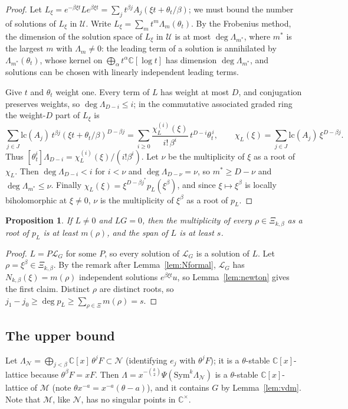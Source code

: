 \documentclass[11pt]{amsart}
\newtheorem{proposition}[thm]{Proposition}
\theoremstyle{definition}
\newcommand{\C}{\mathbb C}
\newcommand{\Sym}{\mathrm{Sym}}
\newcommand{\lc}{\mathrm{lc}}
\begin{document}
\begin{proof}
Let $L_\xi=e^{-\beta\xi t}Le^{\beta\xi t}=\sum_jt^{\beta j}A_j(\xi t+\theta_t/\beta)$; we must bound the number of solutions of $L_\xi$ in $\mathcal U$. Write $L_\xi=\sum_mt^m\Lambda_m(\theta_t)$. By the Frobenius method, the dimension of the solution space of $L_\xi$ in $\mathcal U$ is at most $\deg\Lambda_{m^*}$, where $m^*$ is the largest $m$ with $\Lambda_m\ne0$: the leading term of a solution is annihilated by $\Lambda_{m^*}(\theta_t)$, whose kernel on $\bigoplus_\alpha t^\alpha\C[\log t]$ has dimension $\deg\Lambda_{m^*}$, and solutions can be chosen with linearly independent leading terms.

Give $t$ and $\theta_t$ weight one. Every term of $L$ has weight at most $D$, and conjugation preserves weights, so $\deg\Lambda_{D-i}\le i$; in the commutative associated graded ring the weight-$D$ part of $L_\xi$ is
\[
\sum_{j\in J}\lc(A_j)\,t^{\beta j}(\xi t+\theta_t/\beta)^{D-\beta j}=\sum_{i\ge0}\frac{\chi_L^{(i)}(\xi)}{i!\,\beta^i}\,t^{D-i}\theta_t^{\,i},\qquad\chi_L(\xi)=\sum_{j\in J}\lc(A_j)\,\xi^{D-\beta j}.
\]
Thus $[\theta_t^i]\Lambda_{D-i}=\chi_L^{(i)}(\xi)/(i!\beta^i)$. Let $\nu$ be the multiplicity of $\xi$ as a root of $\chi_L$. Then $\deg\Lambda_{D-i}<i$ for $i<\nu$ and $\deg\Lambda_{D-\nu}=\nu$, so $m^*\ge D-\nu$ and $\deg\Lambda_{m^*}\le\nu$. Finally $\chi_L(\xi)=\xi^{D-\beta j^*}p_L(\xi^\beta)$, and since $\xi\mapsto\xi^\beta$ is locally biholomorphic at $\xi\ne0$, $\nu$ is the multiplicity of $\xi^\beta$ as a root of $p_L$.
\end{proof}

\begin{proposition}\label{prop:lower}
If $L\ne0$ and $LG=0$, then the multiplicity of every $\rho\in\Xi_{k,\beta}$ as a root of $p_L$ is at least $m(\rho)$, and the span of $L$ is at least $s$.
\end{proposition}

\begin{proof}
$L=P\mathcal L_G$ for some $P$, so every solution of $\mathcal L_G$ is a solution of $L$. Let $\rho=\xi^\beta\in\Xi_{k,\beta}$. By the remark after Lemma~\ref{lem:Nformal}, $\mathcal L_G$ has $N_{k,\beta}(\xi)=m(\rho)$ independent solutions $e^{\beta\xi t}u$, so Lemma~\ref{lem:newton} gives the first claim. Distinct $\rho$ are distinct roots, so $j_1-j_0\ge\deg p_L\ge\sum_{\rho\in\Xi}m(\rho)=s$.
\end{proof}

\subsection{The upper bound}
Let $\Lambda_{\mathcal N}=\bigoplus_{j<\beta}\C[x]\,\theta^jF\subset\mathcal N$ (identifying $e_j$ with $\theta^jF$); it is a $\theta$-stable $\C[x]$-lattice because $\theta^\beta F=xF$. Then $\Lambda=x^{-\binom k2}\Psi(\Sym^k\Lambda_{\mathcal N})$ is a $\theta$-stable $\C[x]$-lattice of $\mathcal M$ (note $\theta x^{-a}=x^{-a}(\theta-a)$), and it contains $G$ by Lemma~\ref{lem:vdm}. Note that $\mathcal M$, like $\mathcal N$, has no singular points in $\C^\times$.
\end{document}
